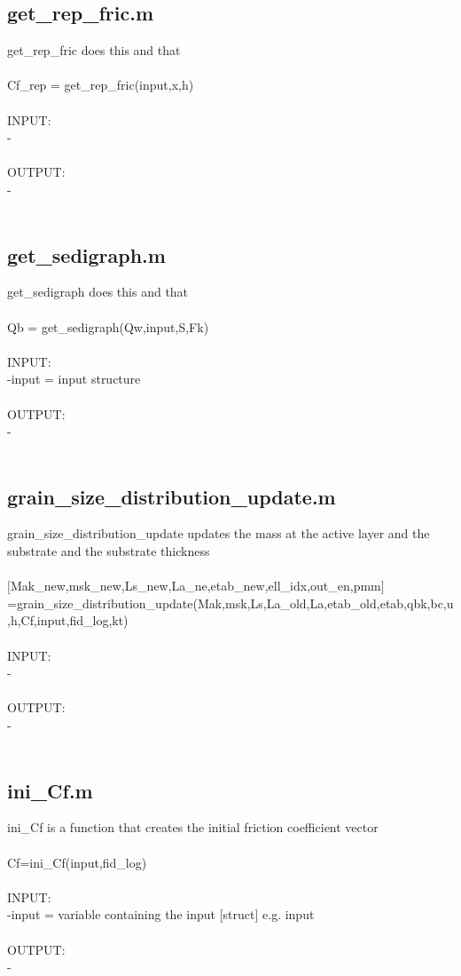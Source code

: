 \subsection{get\_rep\_fric.m}
get\_rep\_fric does this and that \\ 
 \\ 
Cf\_rep = get\_rep\_fric(input,x,h) \\ 
 \\ 
INPUT: \\ 
   - \\ 
 \\ 
OUTPUT: \\ 
   - \\ 
 \\ 
\subsection{get\_sedigraph.m}
get\_sedigraph does this and that \\ 
 \\ 
Qb = get\_sedigraph(Qw,input,S,Fk) \\ 
 \\ 
INPUT: \\ 
   -input = input structure \\ 
 \\ 
OUTPUT: \\ 
   - \\ 
 \\ 
\subsection{grain\_size\_distribution\_update.m}
grain\_size\_distribution\_update updates the mass at the active layer and the substrate and the substrate thickness \\ 
 \\ 
$[$Mak\_new,msk\_new,Ls\_new,La\_ne,etab\_new,ell\_idx,out\_en,pmm$]$=grain\_size\_distribution\_update(Mak,msk,Ls,La\_old,La,etab\_old,etab,qbk,bc,u,h,Cf,input,fid\_log,kt) \\ 
 \\ 
INPUT: \\ 
   - \\ 
 \\ 
OUTPUT: \\ 
   - \\ 
 \\ 
\subsection{ini\_Cf.m}
ini\_Cf is a function that creates the initial friction coefficient vector \\ 
 \\ 
Cf=ini\_Cf(input,fid\_log) \\ 
 \\ 
INPUT: \\ 
   -input = variable containing the input $[$struct$]$ e.g. input \\ 
 \\ 
OUTPUT: \\ 
   - \\ 
 \\ 
